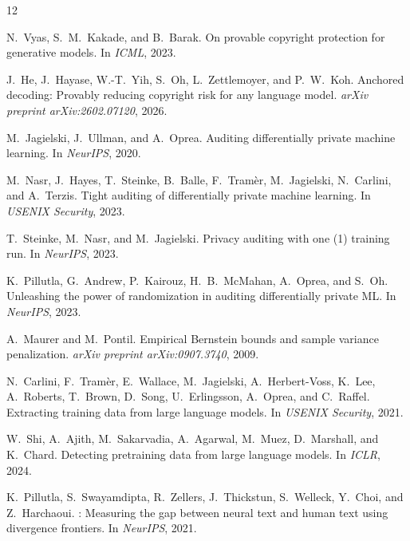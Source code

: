 \documentclass{article}
\begin{document}
\begin{thebibliography}{12}

N.~Vyas, S.~M.~Kakade, and B.~Barak.
\newblock On provable copyright protection for generative models.
\newblock In \emph{ICML}, 2023.

J.~He, J.~Hayase, W.-T.~Yih, S.~Oh, L.~Zettlemoyer, and P.~W.~Koh.
\newblock Anchored decoding: Provably reducing copyright risk for any language model.
\newblock \emph{arXiv preprint arXiv:2602.07120}, 2026.

M.~Jagielski, J.~Ullman, and A.~Oprea.
\newblock Auditing differentially private machine learning.
\newblock In \emph{NeurIPS}, 2020.

M.~Nasr, J.~Hayes, T.~Steinke, B.~Balle, F.~Tram\`{e}r, M.~Jagielski, N.~Carlini, and A.~Terzis.
\newblock Tight auditing of differentially private machine learning.
\newblock In \emph{USENIX Security}, 2023.

T.~Steinke, M.~Nasr, and M.~Jagielski.
\newblock Privacy auditing with one (1) training run.
\newblock In \emph{NeurIPS}, 2023.

K.~Pillutla, G.~Andrew, P.~Kairouz, H.~B.~McMahan, A.~Oprea, and S.~Oh.
\newblock Unleashing the power of randomization in auditing differentially private {ML}.
\newblock In \emph{NeurIPS}, 2023.

A.~Maurer and M.~Pontil.
\newblock Empirical {B}ernstein bounds and sample variance penalization.
\newblock \emph{arXiv preprint arXiv:0907.3740}, 2009.

N.~Carlini, F.~Tram\`{e}r, E.~Wallace, M.~Jagielski, A.~Herbert-Voss, K.~Lee, A.~Roberts, T.~Brown, D.~Song, U.~Erlingsson, A.~Oprea, and C.~Raffel.
\newblock Extracting training data from large language models.
\newblock In \emph{USENIX Security}, 2021.

W.~Shi, A.~Ajith, M.~Sakarvadia, A.~Agarwal, M.~Muez, D.~Marshall, and K.~Chard.
\newblock Detecting pretraining data from large language models.
\newblock In \emph{ICLR}, 2024.

K.~Pillutla, S.~Swayamdipta, R.~Zellers, J.~Thickstun, S.~Welleck, Y.~Choi, and Z.~Harchaoui.
: Measuring the gap between neural text and human text using divergence frontiers.
\newblock In \emph{NeurIPS}, 2021.


\end{thebibliography}
\end{document}
